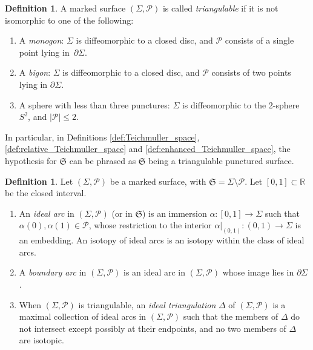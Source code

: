 \documentclass[pdftex]{sigma}
\numberwithin{equation}{section}
\theoremstyle{definition}
\newtheorem{Definition}[Theorem]{Definition}
\begin{document}
\begin{Definition}
\label{def:triangulable}
A marked surface $(\Sigma,\mathcal{P})$ is called {\em triangulable} if it is not isomorphic to one of the following:
\begin{enumerate}[label={\rm (\arabic*)}]\itemsep=0pt
\item A {\em monogon}: $\Sigma$ is diffeomorphic to a closed disc, and $\mathcal{P}$ consists of a single point lying in~$\partial \Sigma$.
\item A {\em bigon}: $\Sigma$ is diffeomorphic to a closed disc, and $\mathcal{P}$ consists of two points lying in $\partial \Sigma$.
\item A sphere with less than three punctures: $\Sigma$ is diffeomorphic to the 2-sphere $S^2$, and $|\mathcal{P}|\le 2$.
\end{enumerate}
\end{Definition}
In particular, in Definitions \ref{def:Teichmuller_space}, \ref{def:relative_Teichmuller_space} and \ref{def:enhanced_Teichmuller_space}, the hypothesis for $\mathfrak{S}$ can be phrased as $\mathfrak{S}$ being a triangulable punctured surface.
\begin{Definition}
\label{def:ideal_triangulation}
Let $(\Sigma,\mathcal{P})$ be a marked surface, with $\mathfrak{S} = \Sigma \setminus \mathcal{P}$. Let $[0,1] \subset \mathbb{R}$ be the closed interval.
\begin{enumerate}[label={\rm (\arabic*)}]\itemsep=0pt
\item An {\em ideal arc} in $(\Sigma,\mathcal{P})$ (or in $\mathfrak{S}$) is an immersion $\alpha \colon [0,1] \to \Sigma$ such that $\alpha(0),\alpha(1) \in \mathcal{P}$, whose restriction to the interior $\alpha|_{(0,1)} \colon (0,1) \to \Sigma$ is an embedding. An isotopy of ideal arcs is an isotopy within the class of ideal arcs.
\item A {\em boundary arc} in $(\Sigma,\mathcal{P})$ is an ideal arc in $(\Sigma,\mathcal{P})$ whose image lies in $\partial \Sigma$.
\item When $(\Sigma,\mathcal{P})$ is triangulable, an {\em ideal triangulation} $\Delta$ of $(\Sigma,\mathcal{P})$ is a maximal collection of ideal arcs in $(\Sigma,\mathcal{P})$ such that the members of $\Delta$ do not intersect except possibly at their endpoints, and no two members of $\Delta$ are isotopic.
\end{enumerate}
\end{Definition}
\end{document}
